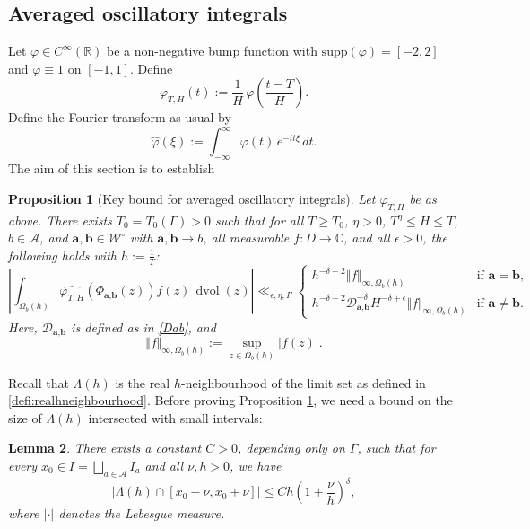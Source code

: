 \documentclass[12pt,letterpaper]{amsart}
\theoremstyle{plain}
\newtheorem{prop}{Proposition}[section]
\newtheorem{lemma}[prop]{Lemma}
\theoremstyle{definition}
\theoremstyle{remark}
\newcommand{\Aa}{\textbf{a}}
\newcommand{\Bb}{\textbf{b}}
\newcommand{\CC}{\mathbb{C}}
\DeclareMathOperator{\dvol}{dvol}
\begin{document}
\subsection{Averaged oscillatory integrals}\label{sec:averoscint}
Let $\varphi \in C^\infty(\mathbb{R})$ be a non-negative bump function with $\mathrm{supp}(\varphi) = [-2, 2]$ and $\varphi \equiv 1$ on $[-1, 1]$. Define
\[
\varphi_{T,H}(t) := \frac{1}{H}\, \varphi\left( \frac{t - T}{H} \right).
\]
Define the Fourier transform as usual by
\[
\widehat{\varphi}(\xi) := \int_{-\infty}^\infty \varphi(t)\, e^{-it\xi}\, dt.
\]
The aim of this section is to establish

\begin{prop}[Key bound for averaged oscillatory integrals]\label{prop:FOURIER} Let $\varphi_{T,H}$ be as above. There exists $T_0 = T_0(\Gamma) > 0$ such that for all $T \ge T_0$, $\eta > 0$, $T^\eta \le H \le T$, $b \in \mathcal{A}$, and $\Aa, \Bb \in \mathcal{W}^\circ$ with $\Aa, \Bb \to b$, all measurable $f \colon D \to \CC$, and all $\epsilon > 0$, the following holds with $h := \frac{1}{T}$:
\[
\left\vert \int_{\Omega_b(h)} \widehat{\varphi_{T,H}}\left(\Phi_{\Aa,\Bb}(z)\right) f(z)\, \dvol(z) \right\vert \ll_{\epsilon,\eta,\Gamma} 
\begin{cases}
h^{-\delta + 2} \Vert f \Vert_{\infty, \Omega_b(h)} & \text{if } \Aa = \Bb, \\[0.5em]
h^{-\delta + 2} \mathcal{D}_{\Aa, \Bb}^{-\delta} H^{-\delta + \epsilon} \Vert f \Vert_{\infty, \Omega_b(h)} & \text{if } \Aa \neq \Bb.
\end{cases}
\]
Here, $\mathcal{D}_{\Aa, \Bb}$ is defined as in \eqref{Dab}, and
\[
\Vert f \Vert_{\infty, \Omega_b(h)} := \sup_{z \in \Omega_b(h)} \vert f(z) \vert.
\]
\end{prop}


Recall that $\Lambda(h)$ is the real $h$-neighbourhood of the limit set as defined in \eqref{defi:realhneighbourhood}. Before proving Proposition \ref{prop:FOURIER}, we need a bound on the size of $\Lambda(h)$ intersected with small intervals:

\begin{lemma}\label{lem:boundInSmallIntervals}
There exists a constant $C > 0$, depending only on $\Gamma$, such that for every $x_0 \in I = \bigsqcup_{a \in \mathcal{A}} I_a$ and all $\nu, h > 0$, we have
\[
|\Lambda(h) \cap [x_0 - \nu, x_0 + \nu]| \le C h \left(1 + \frac{\nu}{h} \right)^\delta,
\]
where $\vert \cdot\vert$ denotes the Lebesgue measure.
\end{lemma}
\end{document}
